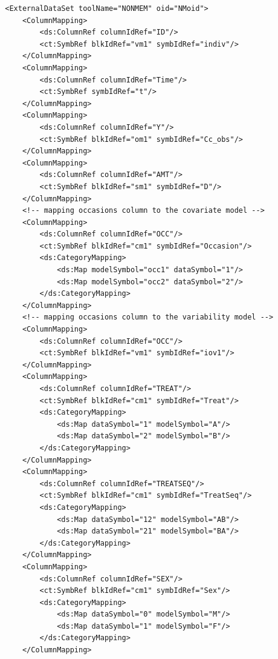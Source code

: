 \lstset{language=XML}
\begin{lstlisting}
        <ExternalDataSet toolName="NONMEM" oid="NMoid">
            <ColumnMapping>
                <ds:ColumnRef columnIdRef="ID"/>
                <ct:SymbRef blkIdRef="vm1" symbIdRef="indiv"/>
            </ColumnMapping>
            <ColumnMapping>
                <ds:ColumnRef columnIdRef="Time"/>
                <ct:SymbRef symbIdRef="t"/>
            </ColumnMapping>
            <ColumnMapping>
                <ds:ColumnRef columnIdRef="Y"/>
                <ct:SymbRef blkIdRef="om1" symbIdRef="Cc_obs"/>
            </ColumnMapping>
            <ColumnMapping>
                <ds:ColumnRef columnIdRef="AMT"/>
                <ct:SymbRef blkIdRef="sm1" symbIdRef="D"/>
            </ColumnMapping>
            <!-- mapping occasions column to the covariate model -->
            <ColumnMapping>
                <ds:ColumnRef columnIdRef="OCC"/>
                <ct:SymbRef blkIdRef="cm1" symbIdRef="Occasion"/>
                <ds:CategoryMapping>
                    <ds:Map modelSymbol="occ1" dataSymbol="1"/>
                    <ds:Map modelSymbol="occ2" dataSymbol="2"/>
                </ds:CategoryMapping>
            </ColumnMapping>
            <!-- mapping occasions column to the variability model -->
            <ColumnMapping>
                <ds:ColumnRef columnIdRef="OCC"/>
                <ct:SymbRef blkIdRef="vm1" symbIdRef="iov1"/>
            </ColumnMapping>
            <ColumnMapping>
                <ds:ColumnRef columnIdRef="TREAT"/>
                <ct:SymbRef blkIdRef="cm1" symbIdRef="Treat"/>
                <ds:CategoryMapping>
                    <ds:Map dataSymbol="1" modelSymbol="A"/>
                    <ds:Map dataSymbol="2" modelSymbol="B"/>
                </ds:CategoryMapping>
            </ColumnMapping>
            <ColumnMapping>
                <ds:ColumnRef columnIdRef="TREATSEQ"/>
                <ct:SymbRef blkIdRef="cm1" symbIdRef="TreatSeq"/>
                <ds:CategoryMapping>
                    <ds:Map dataSymbol="12" modelSymbol="AB"/>
                    <ds:Map dataSymbol="21" modelSymbol="BA"/>
                </ds:CategoryMapping>
            </ColumnMapping>
            <ColumnMapping>
                <ds:ColumnRef columnIdRef="SEX"/>
                <ct:SymbRef blkIdRef="cm1" symbIdRef="Sex"/>
                <ds:CategoryMapping>
                    <ds:Map dataSymbol="0" modelSymbol="M"/>
                    <ds:Map dataSymbol="1" modelSymbol="F"/>
                </ds:CategoryMapping>
            </ColumnMapping>
            

\end{lstlisting}
